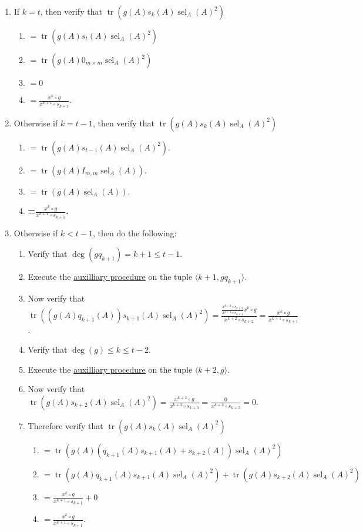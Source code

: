 \documentclass[twocolumn]{article}
\DeclareMathOperator{\tr}{tr}
\DeclareMathOperator{\sel}{sel}
\begin{document}
					\begin{enumerate}
						\item If $k=t$, then verify that $\tr(g(A)s_k(A)\sel_A(A)^2)$
						\begin{enumerate}
							\item $=\tr(g(A)s_t(A)\sel_A(A)^2)$
							\item $=\tr(g(A)0_{m\times m}\sel_A(A)^2)$
							\item $=0$
							\item $=\frac{x^k\circ g}{x^{k+1}\circ s_{k+1}}$.
						\end{enumerate}
						\item Otherwise if $k=t-1$, then verify that $\tr(g(A)s_k(A)\sel_A(A)^2)$
						\begin{enumerate}
							\item $=\tr(g(A)s_{t-1}(A)\sel_A(A)^2)$.
							\item $=\tr(g(A)I_{m,m}\sel_A(A))$.
							\item $=\tr(g(A)\sel_A(A))$.
							\item \textbf{=$\frac{x^k\circ g}{x^{k+1}\circ s_{k+1}}$.}
						\end{enumerate}
						\item Otherwise if $k<t-1$, then do the following:
						\begin{enumerate}
							\item Verify that $\deg(gq_{k+1})=k+1\le t-1$.
							\item Execute the \hyperref[sec:procedure 73 auxilliary procedure]{auxilliary procedure} on the tuple $\langle k+1, gq_{k+1}\rangle$.
							\item Now verify that $\tr((g(A)q_{k+1}(A))s_{k+1}(A)\sel_A(A)^2)=\frac{\frac{x^{k+2}\circ s_{k+2}}{x^{k+1}\circ s_{k+1}}x^k\circ g}{x^{k+2}\circ s_{k+2}}=\frac{x^k\circ g}{x^{k+1}\circ s_{k+1}}$.
							\item Verify that $\deg(g)\le k\le t-2$.
							\item Execute the \hyperref[sec:procedure 73 auxilliary procedure]{auxilliary procedure} on the tuple $\langle k+2,g\rangle$.
							\item Now verify that $\tr(g(A)s_{k+2}(A)\sel_A(A)^2)=\frac{x^{k+2}\circ g}{x^{k+3}\circ{s_{k+3}}}=\frac{0}{x^{k+3}\circ{s_{k+3}}}=0$.
							\item Therefore verify that $\tr(g(A)s_k(A)\sel_A(A)^2)$
							\begin{enumerate}
								\item $=\tr(g(A)(q_{k+1}(A)s_{k+1}(A)+s_{k+2}(A))\sel_A(A)^2)$
								\item $=\tr(g(A)q_{k+1}(A)s_{k+1}(A)\sel_A(A)^2)+\tr(g(A)s_{k+2}(A)\sel_A(A)^2)$
								\item $=\frac{x^k\circ g}{x^{k+1}\circ s_{k+1}}+0$
								\item $=\frac{x^k\circ g}{x^{k+1}\circ s_{k+1}}$.
							\end{enumerate}
						\end{enumerate}
					\end{enumerate}
\end{document}
